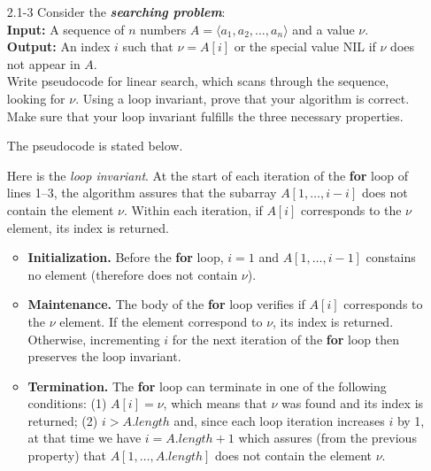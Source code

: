 \begin{enumerate}
\item[2.1{-}3]{Consider the \textbf{\emph{searching problem}}:\vspace{1mm}\\
\textbf{Input:} A sequence of $n$ numbers $A = \langle a_1, a_2, \dots, a_n \rangle$ and a value $\nu$.\\
\textbf{Output:} An index $i$ such that $\nu = A[i]$ or the special value NIL if $\nu$ does not appear in $A$.\vspace{1mm}\\
Write pseudocode for linear search, which scans through the sequence, looking
for $\nu$. Using a loop invariant, prove that your algorithm is correct. Make
sure that your loop invariant fulfills the three necessary properties.}

\begin{framed}
The pseudocode is stated below.\\
\begin{algorithm}[H]
\SetAlgoNoEnd\DontPrintSemicolon
\BlankLine
{}
\end{algorithm}

Here is the \emph{loop invariant}. At the start of each iteration of the
\textbf{for} loop of lines 1{--}3, the algorithm assures that the subarray $A[1,
\dots, i - i]$ does not contain the element $\nu$. Within each iteration, if
$A[i]$ corresponds to the $\nu$ element, its index is returned.

\begin{itemize}
  \item \textbf{Initialization.} Before the \textbf{for} loop, $i = 1$ and $A[1,
    \dots, i - 1]$ constains no element (therefore does not contain $\nu$).

  \item \textbf{Maintenance.} The body of the \textbf{for} loop verifies if
    $A[i]$ corresponds to the $\nu$ element. If the element correspond to $\nu$,
    its index is returned. Otherwise, incrementing $i$ for the next iteration of
    the \textbf{for} loop then preserves the loop invariant.

  \item \textbf{Termination.} The \textbf{for} loop can terminate in one of the
    following conditions: (1) $A[i] = \nu$, which means that $\nu$ was found and
    its index is returned; (2) $i > A.length$ and, since each loop iteration
    increases $i$ by 1, at that time we have $i = A.length + 1$ which assures
    (from the previous property) that $A[1, \dots, A.length]$ does not contain
    the element $\nu$.
\end{itemize}
\end{framed}


\end{enumerate}
